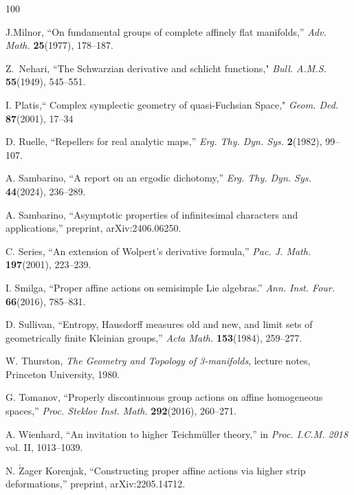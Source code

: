 \documentclass{amsart}
\theoremstyle{plain}
\theoremstyle{definition}
\theoremstyle{remark}
\newcommand{\<}{\left <}
\renewcommand{\>}{\right >}
\begin{document}
\begin{thebibliography}{100}
\begin{scriptsize}
 J.Milnor, ``On fundamental groups of complete affinely flat manifolds,''
{\em Adv. Math.} {\bf 25}(1977), 178--187.


 Z.~Nehari, ``The Schwarzian derivative and schlicht functions,"
 {\em Bull. A.M.S.} {\bf 55}(1949), 545--551.


 I. Platis,`` Complex symplectic geometry of quasi-Fuchsian Space," {\em Geom. Ded.} {\bf 87}(2001), 17--34

 D. Ruelle, ``Repellers for real analytic maps,'' {\em Erg. Thy.  Dyn. Sys.} {\bf 2}(1982),  99--107.


 A. Sambarino, ``A report on an ergodic dichotomy,''
{\em Erg. Thy.  Dyn. Sys.} {\bf 44}(2024), 236--289.


 A. Sambarino, ``Asymptotic properties of infinitesimal characters and applications,'' preprint, arXiv:2406.06250.

 C. Series, ``An extension of Wolpert's derivative formula,'' {\em Pac. J. Math.} {\bf197}(2001), 223--239.

 I. Smilga, ``Proper affine actions on semisimple Lie algebras.''  {\em Ann. Inst. Four.} {\bf 66}(2016),  785--831.

 D. Sullivan, ``Entropy, Hausdorff measures old and new, and limit sets of geometrically finite Kleinian groups,'' {\em Acta Math.}
{\bf 153}(1984),  259--277.

 W. Thurston, {\em The Geometry and Topology of 3-manifolds}, lecture notes, Princeton University, 1980.

 G. Tomanov, ``Properly discontinuous group actions on affine homogeneous spaces,''
{\em Proc. Steklov Inst. Math.} {\bf 292}(2016),  260--271.

 A. Wienhard, ``An invitation to higher Teichmüller theory,'' in {\em Proc. I.C.M. 2018} vol. II, 1013--1039.


  N. $\check{\mathrm{Z}}$ager Korenjak, ``Constructing proper affine actions via higher strip deformations,'' preprint,
 arXiv:2205.14712.

\end{scriptsize}
\end{thebibliography}
\end{document}
